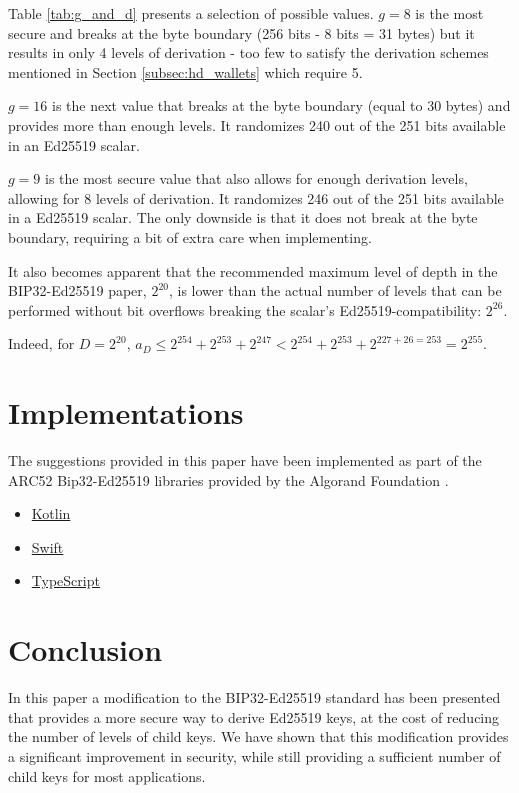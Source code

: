 \documentclass[12pt, a4paper, twocolumn]{article}
\begin{document}
Table \ref{tab:g_and_d} presents a selection of possible values. $g=8$ is the most secure and breaks at the byte boundary (256 bits - 8 bits = 31 bytes) but it results in only 4 levels of derivation - too few to satisfy the derivation schemes mentioned in Section \ref{subsec:hd_wallets} which require 5.

$g=16$ is the next value that breaks at the byte boundary (equal to 30 bytes) and provides more than enough levels. It randomizes 240 out of the 251 bits available in an Ed25519 scalar.

$g=9$ is the most secure value that also allows for enough derivation levels, allowing for 8 levels of derivation. It randomizes 246 out of the 251 bits available in a Ed25519 scalar. The only downside is that it does not break at the byte boundary, requiring a bit of extra care when implementing.

It also becomes apparent that the recommended maximum level of depth in the BIP32-Ed25519 paper, $2^{20}$, is lower than the actual number of levels that can be performed without bit overflows breaking the scalar's Ed25519-compatibility: $2^{26}$.

Indeed, for $D=2^{20}$, $a_{D} \leq 2^{254} + 2^{253} + 2^{247} < 2^{254} + 2^{253} + 2^{227+26=253} = 2^{255}$.


\section{Implementations}


The suggestions provided in this paper have been implemented as part of the ARC52 Bip32-Ed25519 libraries provided by the Algorand Foundation \cite{AF}.

\begin{itemize}
  \item \href{https://github.com/algorandfoundation/bip32-ed25519-kotlin}{Kotlin}
  \item \href{https://github.com/algorandfoundation/bip32-ed25519-swift}{Swift}
  \item \href{https://github.com/ehanoc/ARCs/tree/wallet-api-context/assets/arc-0052}{TypeScript}
\end{itemize}


\section{Conclusion}

In this paper a modification to the BIP32-Ed25519 standard has been presented that provides a more secure way to derive Ed25519 keys, at the cost of reducing the number of levels of child keys. We have shown that this modification provides a significant improvement in security, while still providing a sufficient number of child keys for most applications.
\end{document}
